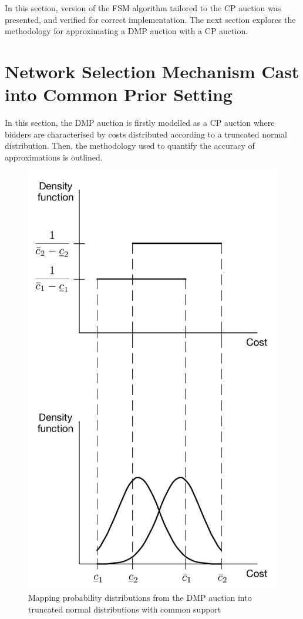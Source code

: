 
In this section, version of the FSM algorithm tailored to the CP auction was presented, and verified for correct implementation. The next section explores the methodology for approximating a DMP auction with a CP auction.

\section{Network Selection Mechanism Cast into Common Prior Setting} %
\label{sec:network_selection_mechanism_cast_into_common_priors_setting_approximation}
In this section, the DMP auction is firstly modelled as a CP auction where bidders are characterised by costs distributed according to a truncated normal distribution. Then, the methodology used to quantify the accuracy of approximations is outlined.

\begin{figure}[p!]
  \includegraphics[width=\figsize]{Approximation/Figures/dmp_to_common_priors}
  \caption{Mapping probability distributions from the DMP auction into truncated normal distributions with common support}
  \label{fig:dmp_to_common_priors_approximation}
\end{figure}

